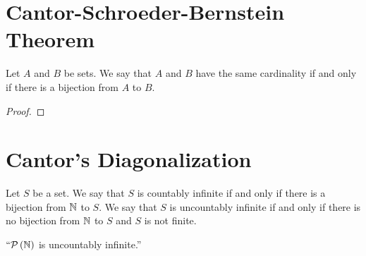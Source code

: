     \section{Cantor-Schroeder-Bernstein Theorem}
        \begin{definition}
            Let $A$ and $B$ be sets. We say that $A$ and $B$ have the same cardinality if and
            only if there is a bijection from $A$ to $B$.
        \end{definition}
        \begin{theorem}
        \end{theorem}
        \begin{proof}
        \end{proof}
    \section{Cantor's Diagonalization}
        \begin{definition}
            Let $S$ be a set. We say that $S$ is countably infinite if and only if
            there is a bijection from $\mathbb{N}$ to $S$. We say that $S$ is uncountably
            infinite if and only if there is no bijection from $\mathbb{N}$ to $S$ and
            $S$ is not finite.
        \end{definition}
        \begin{theorem}
            $``\mathcal{P}\left(\mathbb{N}\right)$ is uncountably infinite.''
            \label{diagonalization}
        \end{theorem}
